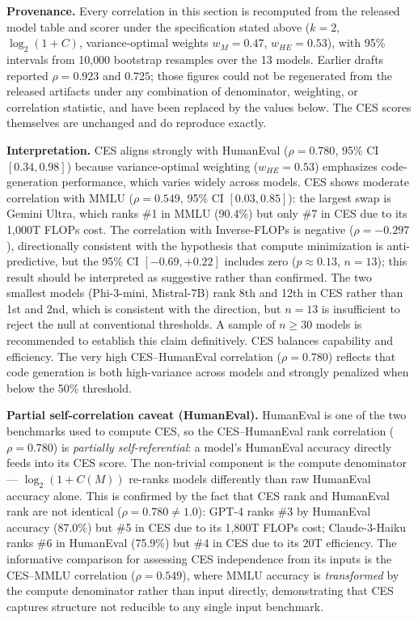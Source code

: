 \documentclass[12pt]{article}
\begin{document}
{\sloppy\noindent\textbf{Provenance.} Every correlation in this section is recomputed from the released model table and scorer under the specification stated above ($k=2$, $\log_2(1+C)$, variance-optimal weights $w_M=0.47$, $w_{HE}=0.53$), with 95\% intervals from 10{,}000 bootstrap resamples over the 13 models. Earlier drafts reported $\rho = 0.923$ and $0.725$; those figures could not be regenerated from the released artifacts under any combination of denominator, weighting, or correlation statistic, and have been replaced by the values below. The CES scores themselves are unchanged and do reproduce exactly.

\textbf{Interpretation.} CES aligns strongly with HumanEval ($\rho = 0.780$, 95\% CI $[0.34, 0.98]$) because variance-optimal weighting ($w_{HE}=0.53$) emphasizes code-generation performance, which varies widely across models. CES shows moderate correlation with MMLU ($\rho = 0.549$, 95\% CI $[0.03, 0.85]$): the largest swap is Gemini Ultra, which ranks \#1 in MMLU (90.4\%) but only \#7 in CES due to its 1,000T FLOPs cost. The correlation with Inverse-FLOPs is negative ($\rho = -0.297$), directionally consistent with the hypothesis that compute minimization is anti-predictive, but the 95\% CI $[-0.69, +0.22]$ includes zero ($p \approx 0.13$, $n=13$); this result should be interpreted as suggestive rather than confirmed. The two smallest models (Phi-3-mini, Mistral-7B) rank 8th and 12th in CES rather than 1st and 2nd, which is consistent with the direction, but $n=13$ is insufficient to reject the null at conventional thresholds. A sample of $n \geq 30$ models is recommended to establish this claim definitively. CES balances capability and efficiency. The very high CES--HumanEval correlation ($\rho = 0.780$) reflects that code generation is both high-variance across models and strongly penalized when below the 50\% threshold.\par}

\noindent\textbf{Partial self-correlation caveat (HumanEval).} HumanEval is one of the two benchmarks used to compute CES, so the CES--HumanEval rank correlation ($\rho = 0.780$) is \textit{partially self-referential}: a model's HumanEval accuracy directly feeds into its CES score. The non-trivial component is the compute denominator --- $\log_2(1+C(M))$ re-ranks models differently than raw HumanEval accuracy alone. This is confirmed by the fact that CES rank and HumanEval rank are not identical ($\rho = 0.780 \neq 1.0$): GPT-4 ranks \#3 by HumanEval accuracy (87.0\%) but \#5 in CES due to its 1,800T FLOPs cost; Claude-3-Haiku ranks \#6 in HumanEval (75.9\%) but \#4 in CES due to its 20T efficiency. The informative comparison for assessing CES independence from its inputs is the CES--MMLU correlation ($\rho = 0.549$), where MMLU accuracy is \textit{transformed} by the compute denominator rather than input directly, demonstrating that CES captures structure not reducible to any single input benchmark.
\end{document}
